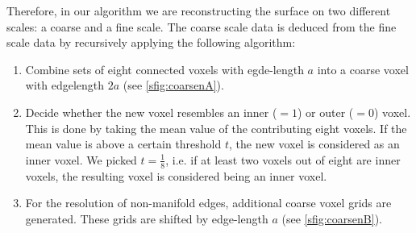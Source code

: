 Therefore, in our algorithm we are reconstructing the surface on two different scales: a coarse and a fine scale. The coarse scale data is deduced from the fine scale data by recursively applying the following algorithm:
\begin{enumerate}
\item Combine sets of eight connected voxels with egde-length $a$ into a coarse voxel with edgelength $2a$ (see \autoref{sfig:coarsenA}).
\item Decide whether the new voxel resembles an inner ($=1$) or outer ($=0$) voxel. This is done by taking the mean value of the contributing eight voxels. If the mean value is above a certain threshold $t$, the new voxel is considered as an inner voxel. We picked $t=\frac{1}{8}$, i.e. if at least two voxels out of eight are inner voxels, the resulting voxel is considered being an inner voxel.
\item For the resolution of non-manifold edges, additional coarse voxel grids are generated. These grids are shifted by edge-length $a$ (see \autoref{sfig:coarsenB}).
\end{enumerate}
